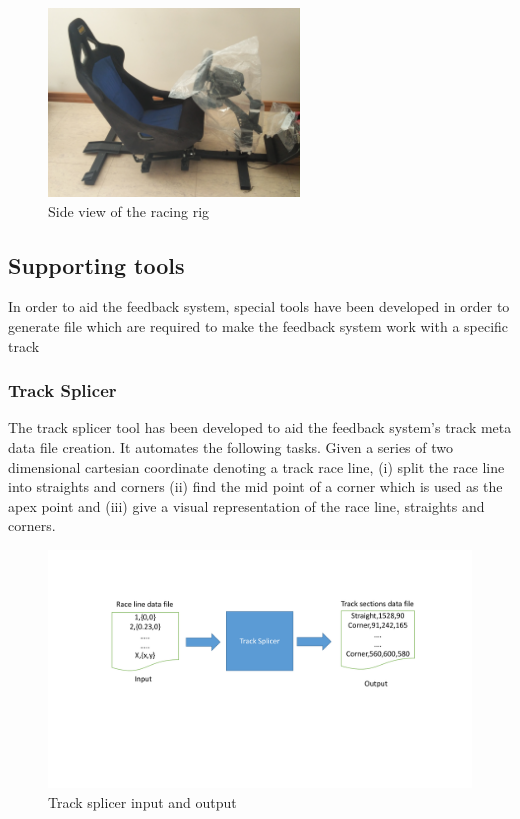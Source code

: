 \begin{figure}[!htb]
	\centering
	\includegraphics[height=5cm]{images/RacingRig}
	\caption{Side view of the racing rig}
	\label{fig:RacingRig}
\end{figure}

\subsection{Supporting tools}
\label{sec:imp-supportingTools}
In order to aid the feedback system, special tools have been developed in order to generate file which are required to make the feedback system work with a specific track

\subsubsection{Track Splicer}
\label{sec:imp-trackSplicer}
The track splicer tool has been developed to aid the feedback system's track meta data file creation. It automates the following tasks. Given a series of two dimensional cartesian coordinate denoting a track race line, (i) split the race line into straights and corners (ii) find the mid point of a corner which is used as the apex point and (iii) give a visual representation of the race line, straights and corners. 

\begin{figure}[!htb]
	\centering
	\includegraphics[width=\textwidth]{diagrams/trackspliceinputoutput.pdf}
	\caption[track splicer input out]{Track splicer input and output}
	\label{fig:diagram-trackspliceinputoutput}
\end{figure}

